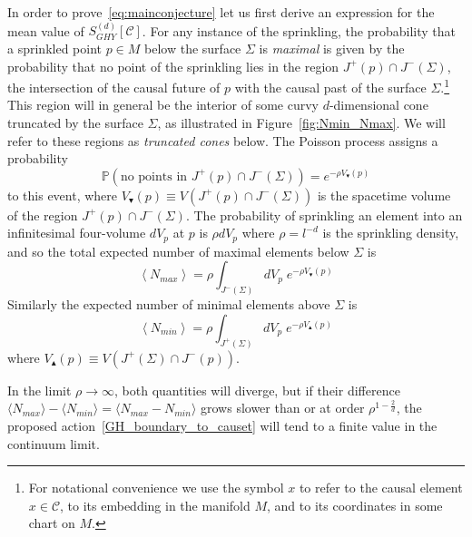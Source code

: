 \documentclass[12pt]{article}
\newcommand{\be}{\begin{equation}}
\newcommand{\ee}{\end{equation}}
\begin{document}
In order to prove~\eqref{eq:mainconjecture} let us first derive an expression for the mean value of $S^{(d)}_{GHY}[\mathcal C]$. For any instance of the sprinkling, the probability that a sprinkled point $p\in M$ below the surface $\Sigma$ is \emph{maximal} is given by the probability that no point of the sprinkling lies in the region $J^{+}(p)\cap J^{-}(\Sigma)$, the intersection of the causal future of $p$ with the causal past of the surface $\Sigma$.\footnote{For notational convenience we use the symbol $x$ to refer to the causal element $x\in\mathcal C$, to its embedding in the manifold $M$, and to its coordinates in some chart on $M$.} This region will in general be the interior of some curvy $d$-dimensional cone truncated by the surface $\Sigma$, as illustrated in Figure~\ref{fig:Nmin_Nmax}. We will refer to these regions as \emph{truncated cones} below. The Poisson process assigns a probability
\be\label{Poisson}
\mathbb P\left(\text{no points in }J^{+}(p)\cap J^{-}(\Sigma)\right)=e^{-\rho V_\blacktriangledown(p)}
\ee
to this event, where $V_\blacktriangledown(p)\equiv V(J^{+}(p)\cap J^{-}(\Sigma))$ is the spacetime volume of the region $J^{+}(p)\cap J^{-}(\Sigma)$. The probability of sprinkling an element into an infinitesimal four-volume $dV_p$ at $p$ is $\rho dV_p$ where $\rho=l^{-d}$ is the sprinkling density, and so the total expected number of maximal elements below $\Sigma$ is
\be\label{eq:nmax}
\left\langle N_{max}\right\rangle =\rho\int_{J^{-}(\Sigma)}dV_p\; e^{-\rho V_\blacktriangledown(p)}
\ee
Similarly the expected number of minimal elements above $\Sigma$ is
\be\label{eq:nmin}
\left\langle N_{min}\right\rangle =\rho\int_{J^{+}(\Sigma)}dV_p\; e^{-\rho V_\blacktriangle(p)}
\ee
where $V_\blacktriangle(p)\equiv V(J^{+}(\Sigma)\cap J^{-}(p))$.

In the limit $\rho\rightarrow\infty$, both quantities will diverge, but if their difference $\langle N_{max}\rangle - \langle N_{min}\rangle = \langle N_{max} - N_{min}\rangle$ grows slower than or at order $\rho^{1-\frac2d}$, the proposed action~\eqref{GH_boundary_to_causet} will tend to a finite value in the continuum limit.
\end{document}
